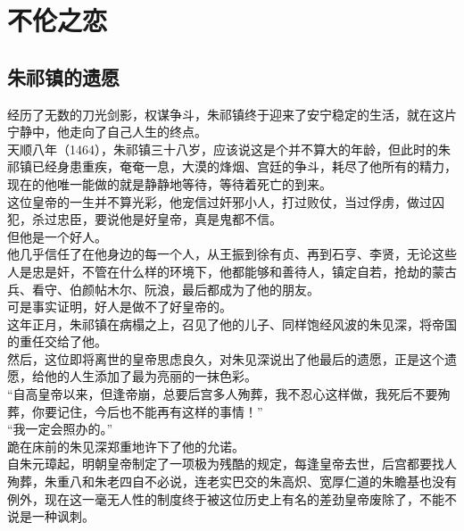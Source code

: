 \section{不伦之恋}
\ifnum{}
	\begin{multicols}{\theparacolNo}
\fi
\subsection{朱祁镇的遗愿}
经历了无数的刀光剑影，权谋争斗，朱祁镇终于迎来了安宁稳定的生活，就在这片宁静中，他走向了自己人生的终点。\\

天顺八年（1464），朱祁镇三十八岁，应该说这是个并不算大的年龄，但此时的朱祁镇已经身患重疾，奄奄一息，大漠的烽烟、宫廷的争斗，耗尽了他所有的精力，现在的他唯一能做的就是静静地等待，等待着死亡的到来。\\

这位皇帝的一生并不算光彩，他宠信过奸邪小人，打过败仗，当过俘虏，做过囚犯，杀过忠臣，要说他是好皇帝，真是鬼都不信。\\

但他是一个好人。\\

他几乎信任了在他身边的每一个人，从王振到徐有贞、再到石亨、李贤，无论这些人是忠是奸，不管在什么样的环境下，他都能够和善待人，镇定自若，抢劫的蒙古兵、看守、伯颜帖木尔、阮浪，最后都成为了他的朋友。\\

可是事实证明，好人是做不了好皇帝的。\\

这年正月，朱祁镇在病榻之上，召见了他的儿子、同样饱经风波的朱见深，将帝国的重任交给了他。\\

然后，这位即将离世的皇帝思虑良久，对朱见深说出了他最后的遗愿，正是这个遗愿，给他的人生添加了最为亮丽的一抹色彩。\\

“自高皇帝以来，但逢帝崩，总要后宫多人殉葬，我不忍心这样做，我死后不要殉葬，你要记住，今后也不能再有这样的事情！”\\

“我一定会照办的。”\\

跪在床前的朱见深郑重地许下了他的允诺。\\

自朱元璋起，明朝皇帝制定了一项极为残酷的规定，每逢皇帝去世，后宫都要找人殉葬，朱重八和朱老四自不必说，连老实巴交的朱高炽、宽厚仁道的朱瞻基也没有例外，现在这一毫无人性的制度终于被这位历史上有名的差劲皇帝废除了，不能不说是一种讽刺。\\


\end{multicols}
